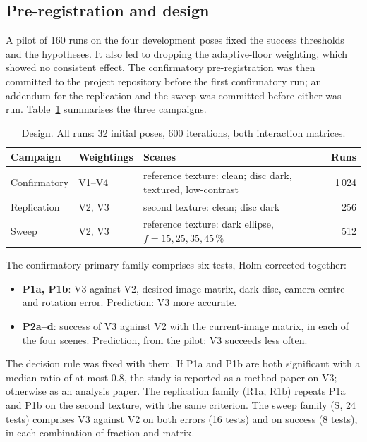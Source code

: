 \documentclass[preprint,12pt]{elsarticle}
\theoremstyle{remark}
\begin{document}
\subsection{Pre-registration and design}
\label{sec:prereg}
A pilot of 160 runs on the four development poses fixed the success
thresholds and the hypotheses. It also led to dropping the adaptive-floor
weighting, which showed no consistent effect. The confirmatory pre-registration
was then committed to the project repository before the first confirmatory
run; an addendum for the replication and the sweep was committed before
either was run. Table~\ref{tab:design} summarises the three campaigns.

\begin{table}[t]
\centering
\caption{Design. All runs: 32 initial poses, 600 iterations, both interaction
matrices.}
\label{tab:design}
\small
\begin{tabular}{@{}llp{}r@{}}
\toprule
Campaign & Weightings & Scenes & Runs \\
\midrule
Confirmatory & V1--V4 & reference texture: clean; disc dark, textured, low-contrast & 1\,024 \\
Replication & V2, V3 & second texture: clean; disc dark & 256 \\
Sweep & V2, V3 & reference texture: dark ellipse, $f=15,25,35,45\,\%$ & 512 \\
\bottomrule
\end{tabular}
\end{table}

The confirmatory primary family comprises six tests, Holm-corrected together:
\begin{itemize}
\item \textbf{P1a, P1b}: V3 against V2, desired-image matrix, dark disc,
  camera-centre and rotation error. Prediction: V3 more accurate.
\item \textbf{P2a--d}: success of V3 against V2 with the current-image matrix,
  in each of the four scenes. Prediction, from the pilot: V3 succeeds less
  often.
\end{itemize}
The decision rule was fixed with them. If P1a and P1b are both significant with
a median ratio of at most 0.8, the study is reported as a method paper on V3;
otherwise as an analysis paper. The replication family (R1a, R1b) repeats P1a
and P1b on the second texture, with the same criterion. The sweep family
(S, 24 tests) comprises V3 against V2 on both errors (16 tests) and on
success (8 tests), in each combination of fraction and matrix.
\end{document}
